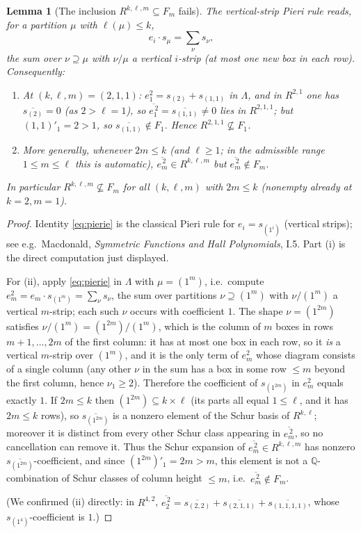 \documentclass{amsart}
\newtheorem{lemma}{Lemma}
\theoremstyle{definition}
\newcommand{\Q}{\mathbb{Q}}
\newcommand{\rkl}{R^{k,\ell}}
\newcommand{\Rklm}{R^{k,\ell,m}}
\begin{document}
\begin{lemma}[The inclusion $\Rklm\subseteq F_m$ fails]\label{lem:RnotinF}
The vertical-strip Pieri rule reads, for a partition $\mu$ with $\ell(\mu)\le k$,
\begin{equation}\label{eq:pierie}
e_i\cdot s_\mu=\sum_{\nu}s_\nu ,
\end{equation}
the sum over $\nu\supseteq\mu$ with $\nu/\mu$ a vertical $i$-strip (at most one new
box in each row). Consequently:
\begin{enumerate}
\item[\textup{(i)}] At $(k,\ell,m)=(2,1,1)$: $e_1^2=s_{(2)}+s_{(1,1)}$ in $\Lambda$,
and in $R^{2,1}$ one has $\overline{s_{(2)}}=0$ (as $2>\ell=1$), so
$\overline{e_1^{\,2}}=\overline{s_{(1,1)}}\neq0$ lies in $R^{2,1,1}$; but
$(1,1)'_1=2>1$, so $\overline{s_{(1,1)}}\notin F_1$. Hence $R^{2,1,1}\not\subseteq F_1$.
\item[\textup{(ii)}] More generally, whenever $2m\le k$ \textup{(}and $\ell\ge1$;
in the admissible range $1\le m\le\ell$ this is automatic\textup{)},
$\overline{e_m^{\,2}}\in\Rklm$ but $\overline{e_m^{\,2}}\notin F_m$.
\end{enumerate}
In particular $\Rklm\not\subseteq F_m$ for all $(k,\ell,m)$ with $2m\le k$ (nonempty
already at $k=2,m=1$).
\end{lemma}

\begin{proof}
Identity \eqref{eq:pierie} is the classical Pieri rule for $e_i=s_{(1^i)}$
(vertical strips); see e.g.\ Macdonald, \emph{Symmetric Functions and Hall
Polynomials}, I.5. Part (i) is the direct computation just displayed.

For (ii), apply \eqref{eq:pierie} in $\Lambda$ with $\mu=(1^m)$, i.e.\ compute
$e_m^2=e_m\cdot s_{(1^m)}=\sum_\nu s_\nu$, the sum over partitions $\nu\supseteq(1^m)$
with $\nu/(1^m)$ a vertical $m$-strip; each such $\nu$ occurs with coefficient $1$.
The shape $\nu=(1^{2m})$ satisfies $\nu/(1^m)=(1^{2m})/(1^m)$, which is the column of
$m$ boxes in rows $m+1,\dots,2m$ of the first column: it has at most one box in each
row, so it \emph{is} a vertical $m$-strip over $(1^m)$, and it is the only term of
$e_m^2$ whose diagram consists of a single column (any other $\nu$ in the sum has a
box in some row $\le m$ beyond the first column, hence $\nu_1\ge2$). Therefore the
coefficient of $s_{(1^{2m})}$ in $e_m^2$ equals exactly $1$. If $2m\le k$ then
$(1^{2m})\subseteq k\times\ell$ (its parts all equal $1\le\ell$, and it has
$2m\le k$ rows), so $\overline{s_{(1^{2m})}}$ is a nonzero element of the Schur basis
of $\rkl$; moreover it is distinct from every other Schur class appearing in
$\overline{e_m^{\,2}}$, so no cancellation can remove it. Thus the Schur expansion of
$\overline{e_m^{\,2}}\in\Rklm$ has nonzero $\overline{s_{(1^{2m})}}$-coefficient,
and since $(1^{2m})'_1=2m>m$, this element is not a $\Q$-combination of Schur classes
of column height $\le m$, i.e.\ $\overline{e_m^{\,2}}\notin F_m$.

(We confirmed (ii) directly: in $R^{4,2}$, $\overline{e_2^{\,2}}=
\overline{s_{(2,2)}}+\overline{s_{(2,1,1)}}+\overline{s_{(1,1,1,1)}}$, whose
$s_{(1^4)}$-coefficient is $1$.)
\end{proof}
\end{document}
